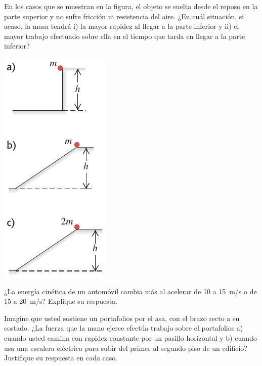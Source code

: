 \documentclass[11pt]{article}
\begin{document}
\begin{multicols}{2}
\begin{exercise}
    En los casos que se muestran en la figura, el objeto se suelta desde el reposo en la parte superior y no sufre fricción ni resistencia del aire. ¿En cuál situación, si acaso, la masa tendrá i) la mayor rapidez al llegar a la parte inferior y ii) el mayor trabajo efectuado sobre ella en el tiempo que tarda en llegar a la parte inferior?
\begin{center}
    \includegraphics[scale=0.5]{figs/p-01.png}
\end{center}
\end{exercise}
\end{multicols}

\begin{exercise}
    ¿La energía cinética de un automóvil cambia más al acelerar de \num{10} a \qty{15}{m/s} o de \num{15} a \qty{20}{m/s}? Explique su respuesta.
\end{exercise}

\begin{exercise}
Imagine que usted sostiene un portafolios por el asa, con el brazo recto a su costado. ¿La fuerza que la mano ejerce efectúa trabajo sobre el portafolios a) cuando usted camina con rapidez constante por un pasillo horizontal y b) cuando usa una escalera eléctrica para subir del primer al segundo piso de un edificio? Justifique su respuesta en cada caso.
\end{exercise}
\end{document}
